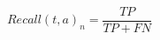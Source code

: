 \begin{equation}
\label{eq:cp4:recall}        
    Recall(t, a)_n = \frac{TP}{TP + FN}
\end{equation}


















% 

% 







